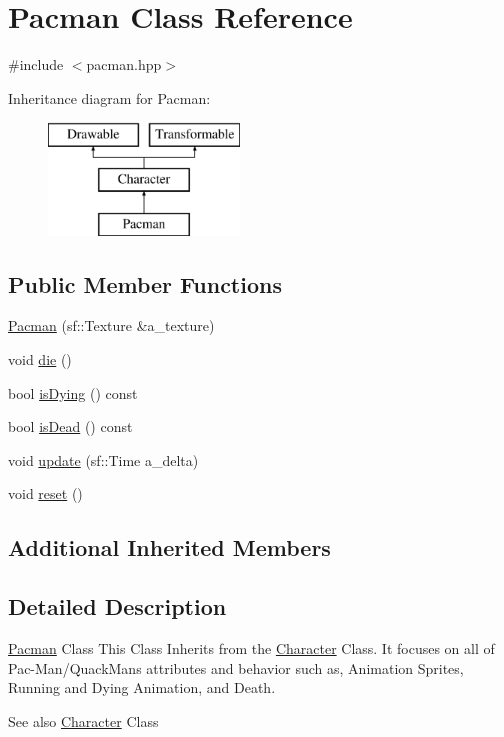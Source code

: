 \hypertarget{class_pacman}{}\section{Pacman Class Reference}
\label{class_pacman}


{\ttfamily \#include $<$pacman.\+hpp$>$}

Inheritance diagram for Pacman\+:\begin{figure}[H]
\begin{center}
\leavevmode
\includegraphics[height=3.000000cm]{class_pacman}
\end{center}
\end{figure}
\subsection*{Public Member Functions}
\begin{DoxyCompactItemize}
\item 
\hyperlink{class_pacman_a7be693fb4bf4dc49ede1f022e79022e0}{Pacman} (sf\+::\+Texture \&a\+\_\+texture)
\item 
void \hyperlink{class_pacman_a880f3f899b2f2d1ee9969fa049f7289d}{die} ()
\item 
bool \hyperlink{class_pacman_afefb1eac50a96a7449ee8e910688614e}{is\+Dying} () const
\item 
bool \hyperlink{class_pacman_a5f0f0398fc20f7c06c5f05a20ad2c1ed}{is\+Dead} () const
\item 
void \hyperlink{class_pacman_a6badb47a28223991a1eb540f9d970e77}{update} (sf\+::\+Time a\+\_\+delta)
\item 
void \hyperlink{class_pacman_a6b190109b2d9400c4eb7c52913ffd0c6}{reset} ()
\end{DoxyCompactItemize}
\subsection*{Additional Inherited Members}


\subsection{Detailed Description}
\hyperlink{class_pacman}{Pacman} Class This Class Inherits from the \hyperlink{class_character}{Character} Class. It focuses on all of Pac-\/\+Man/\+Quack\+Man\textquotesingle{}s attributes and behavior such as, Animation Sprites, Running and Dying Animation, and Death. \begin{DoxySeeAlso}{See also}
\hyperlink{class_character}{Character} Class 
\end{DoxySeeAlso}


